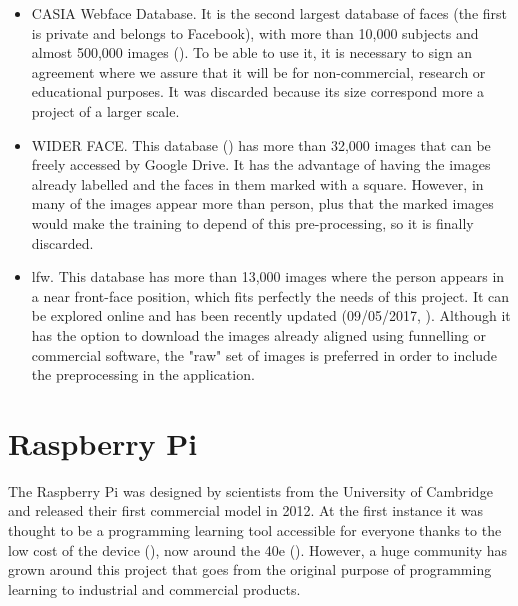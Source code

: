 \begin{itemize}
	\item CASIA Webface Database. It is the second largest database of faces (the first is private and belongs to Facebook), with more than 10,000 subjects and almost 500,000 images (\cite{casia_db}). To be able to use it, it is necessary to sign an agreement where we assure that it will be for non-commercial, research or educational purposes. It was discarded because its size correspond more a project of a larger scale. 
	\item WIDER FACE. This database (\cite{widerf_db}) has more than 32,000 images that can be freely accessed by Google Drive. It has the advantage of having the images already labelled and the faces in them marked with a square. However, in many of the images appear more than person, plus that the marked images would make the training to depend of this pre-processing, so it is finally discarded.
	\item \gls{lfw}. This database has more than 13,000 images where the person appears in a near front-face position, which fits perfectly the needs of this project. It can be explored online and has been recently updated (09/05/2017, \cite{lfw_db}). Although it has the option to download the images already aligned using funnelling or commercial software, the "raw" set of images is preferred in order to include the preprocessing in the application.
\end{itemize}



                                                                         
\section{Raspberry Pi}	
\label{sec:rasp_pi}
The Raspberry Pi was designed by scientists from the University of Cambridge and released their first commercial model in 2012. At the first instance it was thought to be a programming learning tool accessible for everyone thanks to the low cost of the device (\cite{raspberry_pi_for_learning}), now around the 40e (\cite{price_raspberry_pi}). However, a huge community has grown around this project that goes from the original purpose of programming learning to industrial and commercial products.

